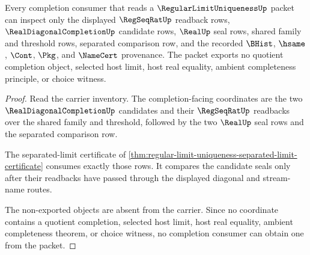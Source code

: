 \begin{theorem}
\label{thm:regular-limit-uniqueness-completion-consumer-boundary}
Every completion consumer that reads a $\RegularLimitUniquenessUp$ packet can inspect only the displayed $\RegSeqRatUp$ readback rows, $\RealDiagonalCompletionUp$ candidate rows, $\RealUp$ seal rows, shared family and threshold rows, separated comparison row, and the recorded $\BHist$, $\hsame$, $\Cont$, $\Pkg$, and $\NameCert$ provenance. The packet exports no quotient completion object, selected host limit, host real equality, ambient completeness principle, or choice witness.
\end{theorem}
\begin{proof}
Read the carrier inventory. The completion-facing coordinates are the two $\RealDiagonalCompletionUp$ candidates and their $\RegSeqRatUp$ readbacks over the shared family and threshold, followed by the two $\RealUp$ seal rows and the separated comparison row.

The separated-limit certificate of \autoref{thm:regular-limit-uniqueness-separated-limit-certificate} consumes exactly those rows. It compares the candidate seals only after their readbacks have passed through the displayed diagonal and stream-name routes.

The non-exported objects are absent from the carrier. Since no coordinate contains a quotient completion, selected host limit, host real equality, ambient completeness theorem, or choice witness, no completion consumer can obtain one from the packet.
\end{proof}

